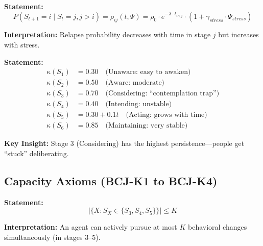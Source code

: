 \begin{tcolorbox}[colback=gray!5!white, colframe=gray!75!black,
    title=Axiom BCJ-D3: Relapse Dynamics]
\textbf{Statement:}
\begin{equation}
P(S_{t+1} = i \mid S_t = j, j > i) = \rho_{ij}(t, \Psi) = \rho_0 \cdot e^{-\lambda \cdot t_{in\_j}} \cdot (1 + \gamma_{stress} \cdot \Psi_{stress})
\end{equation}

\textbf{Interpretation:} Relapse probability decreases with time in stage $j$ but increases with stress.
\end{tcolorbox}

\begin{tcolorbox}[colback=gray!5!white, colframe=gray!75!black,
    title=Axiom BCJ-D6: Stage Persistence Values]
\textbf{Statement:}
\begin{align}
\kappa(S_1) &= 0.30 \quad \text{(Unaware: easy to awaken)} \\
\kappa(S_2) &= 0.50 \quad \text{(Aware: moderate)} \\
\kappa(S_3) &= 0.70 \quad \text{(Considering: ``contemplation trap'')} \\
\kappa(S_4) &= 0.40 \quad \text{(Intending: unstable)} \\
\kappa(S_5) &= 0.30 + 0.1t \quad \text{(Acting: grows with time)} \\
\kappa(S_6) &= 0.85 \quad \text{(Maintaining: very stable)}
\end{align}

\textbf{Key Insight:} Stage 3 (Considering) has the highest persistence---people get ``stuck'' deliberating.
\end{tcolorbox}

\subsection{Capacity Axioms (BCJ-K1 to BCJ-K4)}

\begin{tcolorbox}[colback=gray!5!white, colframe=gray!75!black,
    title=Axiom BCJ-K1: Cognitive Capacity Constraint]
\textbf{Statement:}
\begin{equation}
|\{X : S_X \in \{S_3, S_4, S_5\}\}| \leq K
\end{equation}

\textbf{Interpretation:} An agent can actively pursue at most $K$ behavioral changes simultaneously (in stages 3--5).
\end{tcolorbox}

